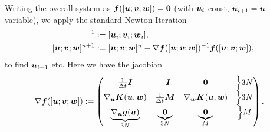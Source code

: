 Writing the overall system as $\boldsymbol{f}([\boldsymbol{u}; \boldsymbol{v}; \boldsymbol{w}]) = \boldsymbol{0}$ (with $\boldsymbol{u}_i$ const, $\boldsymbol{u}_{i+1}=\boldsymbol{u}$ variable), we apply the standard Newton-Iteration
\begin{align}
	[\vu; \vv; \vw]^1 &:= [\vu_i; \vv_i; \vw_i],\\
	[\vu; \vv; \vw]^{n+1} &:= [\vu; \vv; \vw]^{n} - \nabla \vf([\vu; \vv; \vw])^{-1}\vf([\vu; \vv; \vw]), 
\end{align}
to find $\boldsymbol{u}_{i+1}$ etc.
Here we have the jacobian
\begin{align}
	 \nabla \boldsymbol{f}([\boldsymbol{u}; \boldsymbol{v}; \boldsymbol{w}]) &:= \left(\begin{matrix}\frac{1}{\Delta t} \boldsymbol{I} & -\boldsymbol{I} & \boldsymbol{0} & \Bigl\rbrace3N\\
	 									\nabla_{\boldsymbol{u}}\boldsymbol{K}(\boldsymbol{u},\boldsymbol{w}) & \frac{1}{\Delta t}\boldsymbol{M} & \nabla_{\boldsymbol{w}}\boldsymbol{K}(\boldsymbol{u},\boldsymbol{w}) & \Bigl\rbrace3N\\
	 									\underbrace{\nabla_{\boldsymbol{u}}\boldsymbol{g}(\boldsymbol{u})}_{3N} & \underbrace{\boldsymbol{0}}_{3N} & \underbrace{\boldsymbol{0}}_{M} & \Bigl\rbrace M\end{matrix}\right).
\end{align}

